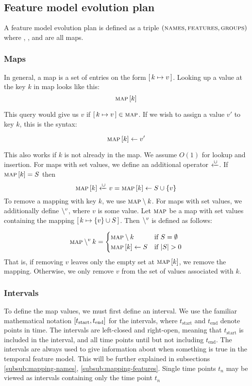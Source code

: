 
\subsection{Feature model evolution plan}
\label{sub:feature-model-evolution-plan}
A feature model evolution plan is defined as a triple $(\textsc{names}, \textsc{features}, \textsc{groups}{})$ where \names, \features, and \groups{} are all maps.

\subsubsection{Maps}
\label{subsub:maps}


In general, a map is a set of entries on the form $[ \,k \mapsto v\, ]$. Looking up a value at the key $k$ in map  looks like this:
\[
  \textsc{map} \left[ k \right]
\]

This query would give us $v$ if $[ \,k \mapsto v\, ] \in \textsc{map}$. If we wish to assign a value $v'$ to key $k$, this is the syntax:

\[
\textsc{map} \left[ k \right] \leftarrow v'
\]

This also works if $k$ is not already in the map. We assume $O(1)$ for lookup and insertion. For maps with set values, we define an additional operator $\xleftarrow{\cup}$. If $\textsc{map} \left[ k \right] = S$ then 
\[\textsc{map} \left[ k \right] \xleftarrow{\cup} v = \textsc{map} \left[ k \right] \leftarrow S \cup \{v\}\]
To remove a mapping with key $k$, we use $\textsc{map} \setminus k$. For maps with set values, we additionally define $\setminus^{v}$, where $v$ is some value. Let $\textsc{map}$ be a map with set values containing the mapping $[ \,k \mapsto \{v\} \cup S\, ]$. Then $\setminus^{v}$ is defined as follows:

\[
  \textsc{map} \setminus^{v} k =
  \begin{cases}
    \textsc{map} \setminus k & \text{if } S = \emptyset\\
    \textsc{map} \left[ k \right] \leftarrow S & \text{if } |S| > 0
  \end{cases}
\]
That is, if removing $v$ leaves only the empty set at $\textsc{map} \left[ k \right]$, we remove the mapping. Otherwise, we only remove $v$ from the set of values associated with $k$. 

\subsubsection{Intervals}
\label{subsub:intervals}
To define the map values, we must first define an interval. We use the familiar mathematical notation $\interval{t_\text{start}}{t_\text{end}}$ for the intervals, where $t_\text{start}$ and $t_\text{end}$ denote points in time. The intervals are left-closed and right-open, meaning that $t_\text{start}$ is included in the interval, and all time points until but not including $t_\text{end}$. The intervals are always used to give information about when something is true in the temporal feature model. This will be further explained in subsections \ref{subsub:mapping-names}, \ref{subsub:mapping-features}. Single time points $t_n$ may be viewed as intervals containing only the time point $t_n$

